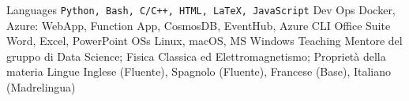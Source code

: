 

\begin{cvskills}
  \cvskill
    {Languages}
    {\texttt{Python, Bash, C/C++, HTML, LaTeX, JavaScript}}
  \cvskill
    {Dev Ops}
    {Docker, Azure: WebApp, Function App, CosmosDB, EventHub, Azure CLI}
  \cvskill
    {Office Suite}
    {Word, Excel, PowerPoint}
  \cvskill
    {OSs}
    {Linux, macOS, MS Windows}
  \cvskill
    {Teaching}
    {Mentore del gruppo di Data Science; Fisica Classica ed Elettromagnetismo; Proprietà della materia}
  \cvskill
    {Lingue}
    {Inglese (Fluente), Spagnolo (Fluente), Francese (Base), Italiano (Madrelingua)}
\end{cvskills}
